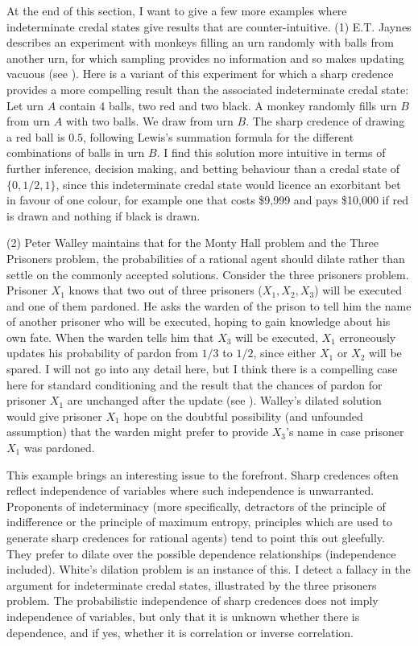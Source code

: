 At the end of this section, I want to give a few more examples where indeterminate credal states give results that are counter-intuitive. (1) E.T. Jaynes describes an experiment with monkeys filling an urn randomly with balls from another urn, for which sampling provides no information and so makes updating vacuous (see ). Here is a variant of this experiment for which a sharp credence provides a more compelling result than the associated indeterminate credal state: Let urn $A$ contain 4 balls, two red and two black. A monkey randomly fills urn $B$ from urn $A$ with two balls. We draw from urn $B$. The sharp credence of drawing a red ball is $0.5$, following Lewis's summation formula for the different combinations of balls in urn $B$. I find this solution more intuitive in terms of further inference, decision making, and betting behaviour than a credal state of $\{0,1/2,1\}$, since this indeterminate credal state would licence an exorbitant bet in favour of one colour, for example one that costs \$9,999 and pays \$10,000 if red is drawn and nothing if black is drawn.

(2) Peter Walley maintains that for the Monty Hall problem and the Three Prisoners problem, the probabilities of a rational agent should dilate rather than settle on the commonly accepted solutions. Consider the three prisoners problem. Prisoner $X_{1}$ knows that two out of three prisoners ($X_{1},X_{2},X_{3}$) will be executed and one of them pardoned. He asks the warden of the prison to tell him the name of another prisoner who will be executed, hoping to gain knowledge about his own fate. When the warden tells him that $X_{3}$ will be executed, $X_{1}$ erroneously updates his probability of pardon from $1/3$ to $1/2$, since either $X_{1}$ or $X_{2}$ will be spared. I will not go into any detail here, but I think there is a compelling case here for standard conditioning and the result that the chances of pardon for prisoner $X_{1}$ are unchanged after the update (see ). Walley's dilated solution would give prisoner $X_{1}$ hope on the doubtful possibility (and unfounded assumption) that the warden might prefer to provide $X_{3}$'s name in case prisoner $X_{1}$ was pardoned.

This example brings an interesting issue to the forefront. Sharp credences often reflect independence of variables where such independence is unwarranted. Proponents of indeterminacy (more specifically, detractors of the principle of indifference or the principle of maximum entropy, principles which are used to generate sharp credences for rational agents) tend to point this out gleefully. They prefer to dilate over the possible dependence relationships (independence included). White's dilation problem is an instance of this. I detect a fallacy in the argument for indeterminate credal states, illustrated by the three prisoners problem. The probabilistic independence of sharp credences does not imply independence of variables, but only that it is unknown whether there is dependence, and if yes, whether it is correlation or inverse correlation.


